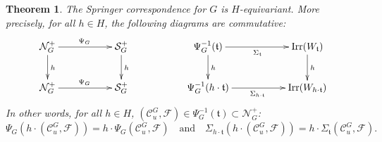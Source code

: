\documentclass[11pt]{amsart}
\newtheorem{thm}{Theorem}[section]
\theoremstyle{definition}
\def\Irr{{\rm Irr}}
\def\ft{{\mathfrak t}}
\begin{document}
\begin{thm}\label{thm:3.2}
The Springer correspondence for $G$ is $H$-equivariant. More precisely, for all 
$h \in H$, the following diagrams are commutative:
\[
\xymatrix{
\mathcal{N}_{G}^{+} \ar[rr]^{\Psi_{G}} \ar[d]^{h} & & \mathcal{S}_{G}^{+} \ar[d]^{h} & & 
\Psi_G^{-1}(\ft) \ar[d]^{h} \ar[rr]_{\Sigma_{\ft}} & & \Irr(W_{\mathfrak{t}}) \ar[d]^h\\
\mathcal{N}_{G}^{+} \ar[rr]^{\Psi_{G}} & & \mathcal{S}_{G}^{+} & & \Psi_G^{-1}(h \cdot \ft) 
\ar[rr]_{\Sigma_{h \cdot \ft}} & & \Irr(W_{h \cdot \mathfrak{t}})
}
\]
In other words, for all $h \in H$, $(\mathcal{C}_{u}^{G},\mathcal{F}) \in 
\Psi_G^{-1}(\ft) \subset \mathcal{N}_{G}^{+}$:
\[
\Psi_{G}(h \cdot (\mathcal{C}_{u}^{G}, \mathcal{F})) = 
h \cdot \Psi_{G}(\mathcal{C}_{u}^{G},\mathcal{F}) \quad 
\mbox{and} \quad \Sigma_{h \cdot \ft}(h \cdot (\mathcal{C}_{u}^{G},\mathcal{F}))=
h \cdot \Sigma_{\ft}(\mathcal{C}_{u}^{G},\mathcal{F}).
\]
\end{thm}
\end{document}
